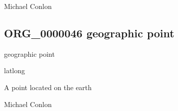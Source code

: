 \documentclass[letterpaper,10pt,english]{sphinxmanual}
\begin{document}
\begin{sphinxShadowBox}

\sphinxAtStartPar
{}
\end{sphinxShadowBox}

\begin{sphinxShadowBox}

\sphinxAtStartPar
Michael Conlon 
\end{sphinxShadowBox}

\begin{sphinxShadowBox}

\sphinxAtStartPar
{}
\end{sphinxShadowBox}
\begin{quote}

\ignorespaces \end{quote}


\subsection{ORG\_0000046 \sphinxhyphen{} geographic point}
\label{\detokenize{doc-ORG_0000046:org-0000046-geographic-point}}\label{\detokenize{doc-ORG_0000046:index-0}}\label{\detokenize{doc-ORG_0000046::doc}}
\begin{sphinxShadowBox}

\sphinxAtStartPar
geographic point
\end{sphinxShadowBox}

\begin{sphinxShadowBox}

\sphinxAtStartPar
latlong
\end{sphinxShadowBox}

\begin{sphinxShadowBox}

\sphinxAtStartPar
A point located on the earth
\end{sphinxShadowBox}

\begin{sphinxShadowBox}

\sphinxAtStartPar
Michael Conlon 
\end{sphinxShadowBox}
\end{document}
